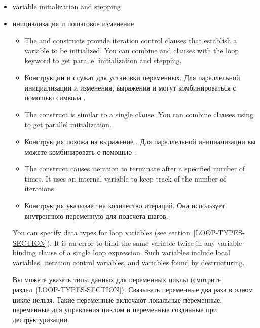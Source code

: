 \begin{itemize}
  
\item variable initialization and stepping

\item инициализация и пошаговое изменение

  \begin{itemize}
  \item The  and  constructs provide iteration
    control clauses that establish a variable to be initialized.  You
    can combine  and  clauses with the loop keyword
     to get parallel initialization and stepping.

  \item Конструкции  и  служат для установки
    переменных. Для параллельной инициализации и изменения, выражения
     и  могут комбинироваться с помощью символа
    .

  \item The  construct is similar to a single 
    clause. You can combine  clauses using  to get
    parallel initialization.

  \item Конструкция  похожа на выражение . Для
    параллельной инициализации вы можете комбинировать  с
    помощью .

  \item The  construct causes iteration to terminate after
    a specified number of times.  It uses an internal variable to keep
    track of the number of iterations.


  \item Конструкция  указывает на количество итераций. Она
    использует внутреннюю переменную для подсчёта шагов.
  \end{itemize}

  You can specify data types for loop variables (see
  section~\ref{LOOP-TYPES-SECTION}).  It is an error to bind the same
  variable twice in any variable-binding clause of a single loop
  expression. Such variables include local variables, iteration
  control variables, and variables found by destructuring.

  Вы можете указать типы данных для переменных циклы (смотрите
  раздел~\ref{LOOP-TYPES-SECTION}). Связывать переменные два раза в
  одном цикле нельзя. Такие переменные включают локальные переменные,
  переменные для управления циклом и переменные созданные при
  деструктуризации.


\end{itemize}
